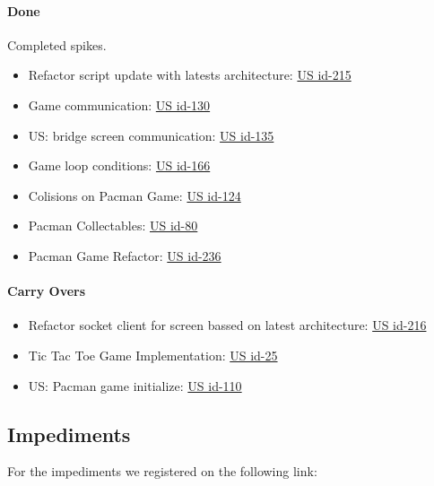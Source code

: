 \paragraph{Done}
Completed spikes.

\begin{itemize}
    \item Refactor script update with latests architecture: \href{https://tree.taiga.io/project/joseluis-teran-coffeetime/us/215?milestone=396824}{US id-215}
    \item Game communication: \href{https://tree.taiga.io/project/joseluis-teran-coffeetime/us/130?milestone=396824}{US id-130}
    \item US: bridge screen communication: \href{https://tree.taiga.io/project/joseluis-teran-coffeetime/us/135?milestone=396824}{US id-135}
    \item Game loop conditions: \href{https://tree.taiga.io/project/joseluis-teran-coffeetime/us/166?milestone=396824}{US id-166}
    \item  Colisions on Pacman Game: \href{https://tree.taiga.io/project/joseluis-teran-coffeetime/us/124?milestone=396824}{US id-124}
    \item  Pacman Collectables: \href{https://tree.taiga.io/project/joseluis-teran-coffeetime/us/80?milestone=396824}{US id-80}
    \item  Pacman Game Refactor: \href{https://tree.taiga.io/project/joseluis-teran-coffeetime/us/236?milestone=396824}{US id-236}
\end{itemize}

\paragraph{Carry Overs}
\begin{itemize}
    \item Refactor socket client for screen bassed on latest architecture: \href{https://tree.taiga.io/project/joseluis-teran-coffeetime/us/216?milestone=397461}{US id-216}
    \item Tic Tac Toe Game Implementation: \href{https://tree.taiga.io/project/joseluis-teran-coffeetime/us/25?milestone=397461}{US id-25}
    \item US: Pacman game initialize: \href{https://tree.taiga.io/project/joseluis-teran-coffeetime/us/110?milestone=397461}{US id-110}
\end{itemize}

\subsection{Impediments}
For the impediments we registered on the following link:


